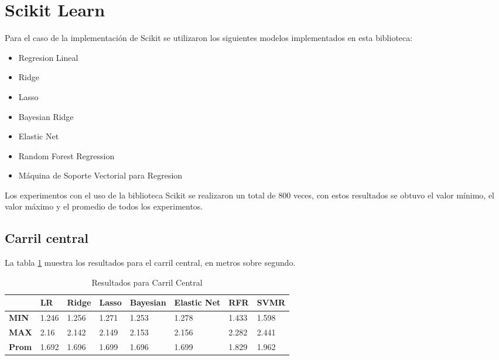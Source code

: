 \section{Scikit Learn}

Para el caso de la implementación de Scikit se utilizaron los siguientes modelos implementados en esta biblioteca:

\begin{itemize}
    \item Regresion Lineal
    \item Ridge
    \item Lasso
    \item Bayesian Ridge
    \item Elastic Net
    \item Random Forest Regression
    \item Máquina de Soporte Vectorial para Regresion
\end{itemize}

Los experimentos con el uso de la biblioteca Scikit se realizaron un total de 800 veces, con estos resultados se obtuvo el valor mínimo, el valor máximo y el promedio de todos los experimentos.

\subsection{Carril central}

La tabla \ref{tab:resultadosScikitCarrilCentral} muestra los resultados para el carril central, en metros sobre segundo.


\begin{table}[H]
    \centering
    \caption{Resultados para Carril Central}
    \label{tab:resultadosScikitCarrilCentral}
    \begin{tabular}{|l|l|l|l|l|l|l|l|} \hline
        & \textbf{LR} & \textbf{Ridge} & \textbf{Lasso} & \textbf{Bayesian} & \textbf{Elastic Net} & \textbf{RFR} & \textbf{SVMR} \\ \hline

        \textbf{MIN} & 1.246 & 1.256 & 1.271 & 1.253 & 1.278                & 1.433 & 1.598 \\ \hline
        \textbf{MAX} & 2.16 & 2.142 & 2.149 & 2.153 & 2.156                & 2.282 & 2.441 \\ \hline
        \textbf{Prom} & 1.692 & 1.696 & 1.699 & 1.696 & 1.699 & 1.829 & 1.962 \\ \hline
    \end{tabular}
\end{table}


